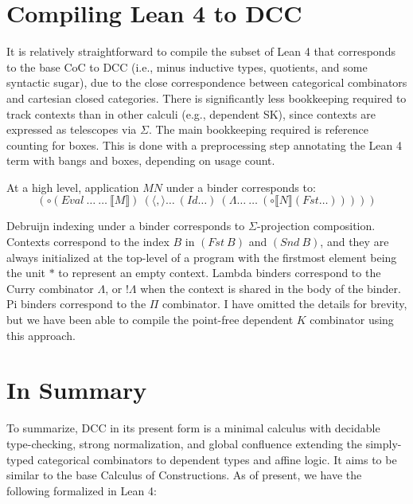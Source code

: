 \documentclass{article}
\newcommand{\llb}{\llbracket}
\newcommand{\rrb}{\rrbracket}
\begin{document}
\section{Compiling Lean 4 to DCC}

It is relatively straightforward to compile the subset of Lean 4 that corresponds to the base CoC to DCC (i.e., minus inductive types, quotients, and some syntactic sugar), due to the close correspondence between categorical combinators and cartesian closed categories. There is significantly less bookkeeping required to track contexts than in other calculi (e.g., dependent SK), since contexts are expressed as telescopes via \(\Sigma\). The main bookkeeping required is reference counting for boxes. This is done with a preprocessing step annotating the Lean 4 term with bangs and boxes, depending on usage count.

At a high level, application \(M N\) under a binder corresponds to:
\begin{equation}
  (\circ (Eval\ \ldots\ \ldots\ \llb M \rrb)\ (\langle , \rangle \ldots\ (Id \ldots)\ (\Lambda \ldots\ \ldots\ (\circ \llb N \rrb (Fst \ldots)))))
\end{equation}

Debruijn indexing under a binder corresponds to \(\Sigma\)-projection composition. Contexts correspond to the index \(B\) in \((Fst\ B)\) and \((Snd\ B)\), and they are always initialized at the top-level of a program with the firstmost element being the unit \(\ast\) to represent an empty context. Lambda binders correspond to the Curry combinator \(\Lambda\), or \(!\Lambda\) when the context is shared in the body of the binder. Pi binders correspond to the \(\Pi\) combinator. I have omitted the details for brevity, but we have been able to compile the point-free dependent \(K\) combinator using this approach.

\section{In Summary}

To summarize, DCC in its present form is a minimal calculus with decidable type-checking, strong normalization, and global confluence extending the simply-typed categorical combinators to dependent types and affine logic. It aims to be similar to the base Calculus of Constructions. As of present, we have the following formalized in Lean 4:
\end{document}
